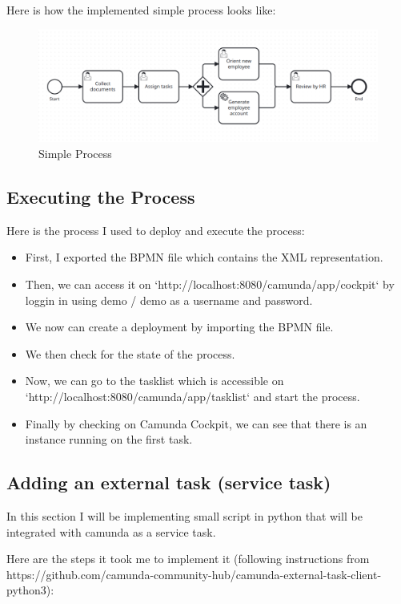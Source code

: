 \documentclass[12pt]{article}
\begin{document}
{  Here is how the implemented simple process looks like:

  \begin{figure}[h]
    \centering
    \includegraphics[width=.90\linewidth]{simple_process.png}
    \caption{Simple Process}
    \label{fig:simple_process}
  \end{figure}

  \subsection{Executing the Process}

  Here is the process I used to deploy and execute the process:

  \begin{itemize}[noitemsep,nolistsep]
    \item First, I exported the BPMN file which contains the XML representation.
    \item Then, we can access it on `http://localhost:8080/camunda/app/cockpit` by loggin in using demo / demo as a username and password.
    \item We now can create a deployment by importing the BPMN file.
    \item We then check for the state of the process.
    \item Now, we can go to the tasklist which is accessible on `http://localhost:8080/camunda/app/tasklist` and start the process.
    \item Finally by checking on Camunda Cockpit, we can see that there is an instance running on the first task.
  \end{itemize}

  \subsection{Adding an external task (service task)}

  In this section I will be implementing small script in python that will be integrated with camunda as a service task.

  Here are the steps it took me to implement it (following instructions from https://github.com/camunda-community-hub/camunda-external-task-client-python3):

}
\end{document}
